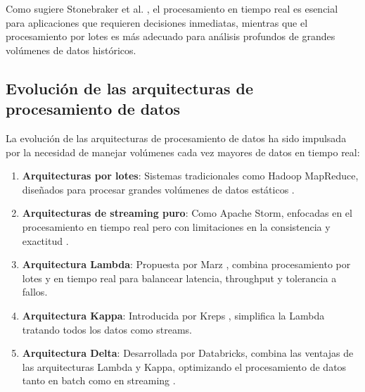 Como sugiere Stonebraker et al. \parencite{stonebraker2005one}, el procesamiento en tiempo real es esencial para aplicaciones
que requieren decisiones inmediatas, mientras que el procesamiento por lotes es más 
adecuado para análisis profundos de grandes volúmenes de datos históricos.

\subsection{Evolución de las arquitecturas de procesamiento de datos}

La evolución de las arquitecturas de procesamiento de datos ha sido impulsada por la necesidad de manejar volúmenes cada vez mayores de datos en tiempo real:

\begin{enumerate}
    \item \textbf{Arquitecturas por lotes}: Sistemas tradicionales como Hadoop MapReduce, diseñados para procesar grandes volúmenes de datos estáticos \parencite{dean2008mapreduce}.
    \item \textbf{Arquitecturas de streaming puro}: Como Apache Storm, enfocadas en el procesamiento en tiempo real pero con limitaciones en la consistencia y exactitud \parencite{toshniwal2014storm}.
    \item \textbf{Arquitectura Lambda}: Propuesta por Marz \parencite{marz2011cap}, combina procesamiento por lotes y en tiempo real para balancear latencia, throughput y tolerancia a fallos.
    \item \textbf{Arquitectura Kappa}: Introducida por Kreps \parencite{kreps2014questioning}, simplifica la Lambda tratando todos los datos como streams.
    \item \textbf{Arquitectura Delta}: Desarrollada por Databricks, combina las ventajas de las arquitecturas Lambda y Kappa, optimizando el procesamiento de datos tanto en batch como en streaming \parencite{deltalake} \parencite{delta}.
\end{enumerate}
\newpage